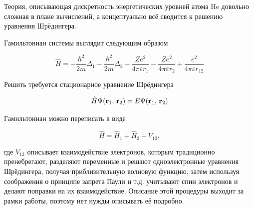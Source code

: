 \documentclass[a4paper, 12pt]{article}
\begin{document}
	Теория, описывающая дискретность энергетических уровней атома He довольно сложная в плане вычислений, а концептуально всё сводится к решению уравнения Шрёдингера.
	
	Гамильтониан системы выглядит следующим образом
	
	\begin{equation}
		\hat{H}=-\frac{\hbar^2}{2m}\Delta_1-\frac{\hbar^2}{2m}\Delta_2-\frac{Ze^2}{4\pi\varepsilon r_1}-\frac{Ze^2}{4\pi\varepsilon r_2}+\frac{e^2}{4\pi\varepsilon r_{12}}
	\end{equation}
	
	Решить требуется стационарное уравнение Шрёдингера
	
	\begin{equation}
		\hat{H}\Psi({\bf r}_1,\,{\bf r}_2)=E\Psi({\bf r}_1,\,{\bf r}_2)
	\end{equation}
	
	Гамильтониан можно переписать в виде
	
	\begin{equation}
		\hat{H}=\hat{H}_1+\hat{H}_2+V_{12},
	\end{equation}
	
	где $V_{12}$ описывает взаимодействие электронов, которым традиционно пренебрегают, разделяют переменные и решают одноэлектронные уравнения Шрёдингера, получая приблизительную волновую функцию, затем используя соображения о принципе запрета Паули и т.д. учитывают спин электронов и делают поправки на их взаимодействие. Описание этой процедуры выходит за рамки работы, поэтому нет нужды описывать её подробно.
\end{document}
